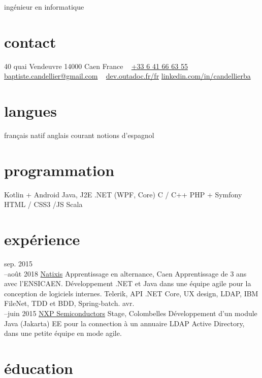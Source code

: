 \documentclass[]{friggeri-cv}
\begin{document}
{ingénieur en informatique}

\begin{aside}
    \section{contact}
    40 quai Vendeuvre
    14000 Caen
    France
    ~
    \href{tel:0033641666355}{+33 6 41 66 63 55}
    \href{mailto:baptiste.candellier@gmail.com}{baptiste.candellier@gmail.com}
    ~
    {\NoAutoSpacing\href{https://dev.outadoc.fr/fr}{dev.outadoc.fr/fr}}
    {\NoAutoSpacing\href{https://www.linkedin.com/in/candellierba/}{linkedin.com/in/candellierba}}
    \section{langues}
    français natif
    anglais courant
    notions d'espagnol
    \section{programmation}
    Kotlin + Android
    Java, J2E
    \csharp .NET (WPF, Core)
    C / C++
    PHP + Symfony
    HTML / CSS3 /JS
    Scala
\end{aside}

\section{expérience}

\begin{entrylist}
	\entry
	{sep. 2015\\--août 2018}
	{\href{https://www.natixis.com}{Natixis}}
	{Apprentissage en alternance, Caen}
	{Apprentissage de 3 ans avec l’ENSICAEN. Développement \csharp .NET et Java dans une équipe agile pour la conception de logiciels internes. Telerik, API .NET Core, UX design, LDAP, IBM FileNet, TDD et BDD, Spring-batch.}
	\entry
	{avr.\\--juin 2015}
	{\href{https://www.nxp.com}{NXP Semiconductors}}
	{Stage, Colombelles}
	{Développement d’un module Java (Jakarta) EE pour la connection à un annuaire LDAP Active Directory, dans une petite équipe en mode agile.}
\end{entrylist}

\section{éducation}
\end{document}
